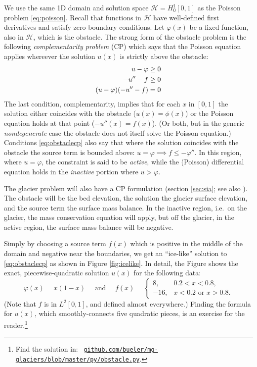 \documentclass[letterpaper,final,12pt,reqno]{amsart}
\theoremstyle{claim}
\numberwithin{equation}{section}
\numberwithin{figure}{section}
\numberwithin{table}{section}
\begin{document}
We use the same 1D domain and solution space $\mathcal{H}=H_0^1[0,1]$ as the Poisson problem \eqref{eq:poisson}.  Recall that functions in $\mathcal{H}$ have well-defined first derivatives and satisfy zero boundary conditions.  Let $\varphi(x)$ be a fixed function, also in $\mathcal{H}$, which is the obstacle.  The strong form of the obstacle problem is the following \emph{complementarity problem} (CP) \cite{Bueler2021,KinderlehrerStampacchia1980} which says that the Poisson equation applies whereever the solution $u(x)$ is strictly above the obstacle:
\begin{align}
  u - \varphi &\ge 0 \label{eq:obstaclecp} \\
  -u''-f &\ge 0 \notag \\
  (u-\varphi)(-u''-f) &= 0 \notag
\end{align}
The last condition, complementarity, implies that for each $x$ in $[0,1]$ the solution either coincides with the obstacle ($u(x)=\phi(x)$) or the Poisson equation holds at that point ($-u''(x)=f(x)$).  (Or both, but in the generic \emph{nondegenerate} \cite{KinderlehrerStampacchia1980} case the obstacle does not itself solve the Poisson equation.)  Conditions \eqref{eq:obstaclecp} also say that where the solution coincides with the obstacle the source term is bounded above: $u=\varphi \implies f \le -\varphi''$.  In this region, where $u=\varphi$, the constraint is said to be \emph{active}, while the (Poisson) differential equation holds in the \emph{inactive} portion where $u>\varphi$.

The glacier problem will also have a CP formulation (section \ref{sec:sia}; see also \cite{Calvoetal2002}).  The obstacle will be the bed elevation, the solution the glacier surface elevation, and the source term the surface mass balance.  In the inactive region, i.e.~on the glacier, the mass conservation equation will apply, but off the glacier, in the active region, the surface mass balance will be negative.

Simply by choosing a source term $f(x)$ which is positive in the middle of the domain and negative near the boundaries, we get an ``ice-like'' solution to \eqref{eq:obstaclecp} as shown in Figure \ref{fig:icelike}.  In detail, the Figure shows the exact, piecewise-quadratic solution $u(x)$ for the following data:
\begin{equation}
\varphi(x) = x(1-x) \quad \text{ and } \quad f(x) = \begin{cases} 8, & 0.2 < x < 0.8, \\
                                                               -16, & x<0.2 \text{ or } x>0.8. \end{cases}  \label{eq:icelikedetails}
\end{equation}
(Note that $f$ is in $L^2[0,1]$, and defined almost everywhere.)  Finding the formula for $u(x)$, which smoothly-connects five quadratic pieces, is an exercise for the reader.\footnote{Find the solution in: \, \href{https://github.com/bueler/mg-glaciers/blob/master/py/obstacle.py}{\texttt{github.com/bueler/mg-glaciers/blob/master/py/obstacle.py}}.}
\end{document}
